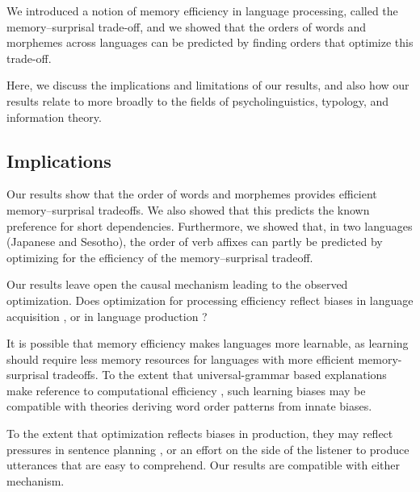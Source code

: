 We introduced a notion of memory efficiency in language processing, called the memory--surprisal trade-off, and we showed that the orders of words and morphemes across languages can be predicted by finding orders that optimize this trade-off. 

Here, we discuss the implications and limitations of our results, and also how our results relate to more broadly to the fields of psycholinguistics, typology, and information theory.



\subsection{Implications}
Our results show that the order of words and morphemes provides efficient memory--surprisal tradeoffs.
We also showed that this predicts the known preference for short dependencies.
Furthermore, we showed that, in two languages (Japanese and Sesotho), the order of verb affixes can partly be predicted by optimizing for the efficiency of the memory--surprisal tradeoff.


Our results leave open the causal mechanism leading to the observed optimization.
Does optimization for processing efficiency reflect biases in language acquisition \citep[e.g.][]{fedzechkina2012language, culbertson2012learning, fedzechkina-human-2017}, or in language production \citep[e.g.][]{macdonald2013language}?

It is possible that memory efficiency makes languages more learnable, as learning should require less memory resources for languages with more efficient memory-surprisal tradeoffs.
To the extent that universal-grammar based explanations make reference to computational efficiency \citep{chomsky2005tree}, such learning biases may be compatible with theories deriving word order patterns from innate biases.

To the extent that optimization reflects biases in production, they may reflect pressures in sentence planning \citep{macdonald2013language}, or an effort on the side of the listener to produce utterances that are easy to comprehend. 
Our results are compatible with either mechanism.


